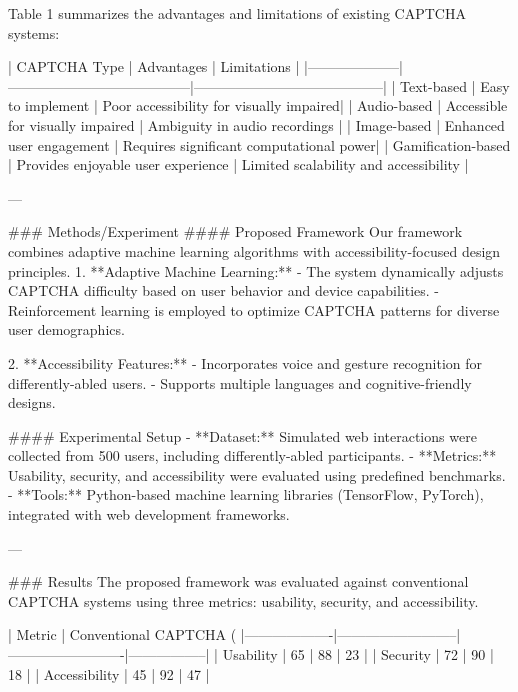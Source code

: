 Table 1 summarizes the advantages and limitations of existing CAPTCHA systems:

| CAPTCHA Type       | Advantages                             | Limitations                              |
|--------------------|---------------------------------------|-----------------------------------------|
| Text-based         | Easy to implement                     | Poor accessibility for visually impaired|
| Audio-based        | Accessible for visually impaired      | Ambiguity in audio recordings           |
| Image-based        | Enhanced user engagement              | Requires significant computational power|
| Gamification-based | Provides enjoyable user experience    | Limited scalability and accessibility   |

---

### Methods/Experiment  
#### Proposed Framework  
Our framework combines adaptive machine learning algorithms with accessibility-focused design principles.  
1. **Adaptive Machine Learning:**  
   - The system dynamically adjusts CAPTCHA difficulty based on user behavior and device capabilities.  
   - Reinforcement learning is employed to optimize CAPTCHA patterns for diverse user demographics.  

2. **Accessibility Features:**  
   - Incorporates voice and gesture recognition for differently-abled users.
   - Supports multiple languages and cognitive-friendly designs.  

#### Experimental Setup  
- **Dataset:** Simulated web interactions were collected from 500 users, including differently-abled participants.  
- **Metrics:** Usability, security, and accessibility were evaluated using predefined benchmarks.  
- **Tools:** Python-based machine learning libraries (TensorFlow, PyTorch), integrated with web development frameworks.  

---

### Results  
The proposed framework was evaluated against conventional CAPTCHA systems using three metrics: usability, security, and accessibility.  

| Metric           | Conventional CAPTCHA (%
|-------------------|--------------------------|-------------------------|-----------------|
| Usability         | 65                       | 88                      | 23              |
| Security          | 72                       | 90                      | 18              |
| Accessibility     | 45                       | 92                      | 47              |

